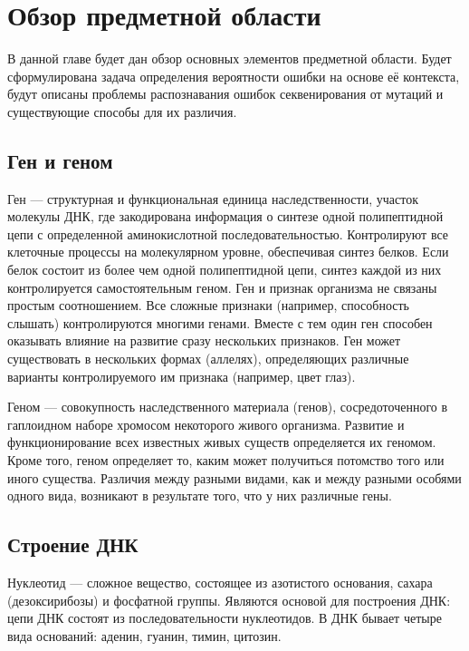 \chapter{Обзор предметной области}
\label{chapter1}

В данной главе будет дан обзор основных элементов предметной области. Будет сформулирована задача определения вероятности ошибки на основе её контекста, будут описаны проблемы распознавания ошибок секвенирования от мутаций и существующие способы для их различия.

\section{Ген и геном}
\label{genomic}

Ген — структурная и функциональная единица наследственности, участок молекулы ДНК, где закодирована информация о синтезе одной полипептидной цепи с определенной аминокислотной последовательностью. Контролируют все клеточные процессы на молекулярном уровне, обеспечивая синтез белков. Если белок состоит из более чем одной полипептидной цепи, синтез каждой из них контролируется самостоятельным геном. Ген и признак организма не связаны простым соотношением. Все сложные признаки (например, способность слышать) контролируются многими генами. Вместе с тем один ген способен оказывать влияние на развитие сразу нескольких признаков. Ген может существовать в нескольких формах (аллелях), определяющих различные варианты контролируемого им признака (например, цвет глаз).

Геном — совокупность наследственного материала (генов), сосредоточенного в гаплоидном наборе хромосом некоторого живого организма. Развитие и функционирование всех известных живых существ определяется их геномом. Кроме того, геном определяет то, каким может получиться потомство того или иного существа. Различия между разными видами, как и между разными особями одного вида, возникают в результате того, что у них различные гены. 

\section {Строение ДНК}

Нуклеотид — сложное вещество,  состоящее из азотистого основания, сахара (дезоксирибозы) и фосфатной группы. Являются основой для построения ДНК: цепи ДНК состоят из последовательности нуклеотидов. В ДНК бывает четыре вида оснований: аденин, гуанин, тимин, цитозин.

